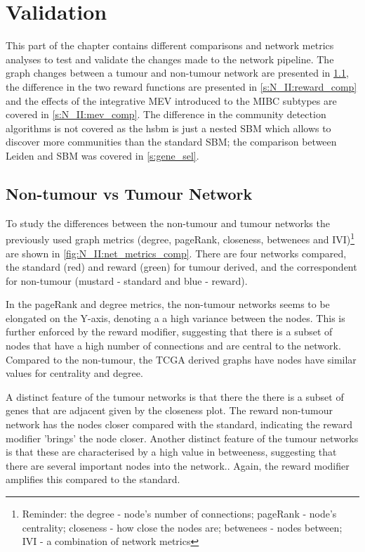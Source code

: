 \section{Validation} \label{s:N_II:validation}


This part of the chapter contains different comparisons and network metrics analyses to test and validate the changes made to the network pipeline. The graph changes between a tumour and non-tumour network are presented in \cref{s:N_II:net_comp}, the difference in the two reward functions are presented in \cref{s:N_II:reward_comp} and the effects of the integrative MEV introduced to the MIBC subtypes are covered in \cref{s:N_II:mev_comp}. The difference in the community detection algorithms is not covered as the \acrfull{hsbm} is just a nested SBM which allows to discover more communities than the standard SBM; the comparison between Leiden and SBM was covered in \cref{s:gene_sel}.


\subsection{Non-tumour vs Tumour Network} \label{s:N_II:net_comp}

To study the differences between the non-tumour and tumour networks the previously used graph metrics (degree, pageRank, closeness, betwenees and IVI)\footnote{Reminder: the degree - node's number of connections; pageRank - node's centrality; closeness - how close the nodes are; betwenees - nodes between; IVI - a combination of network metrics} are shown in \cref{fig:N_II:net_metrics_comp}. There are four networks compared, the standard (red) and reward (green) for tumour derived, and the correspondent for non-tumour (mustard - standard and blue - reward).

In the pageRank and degree metrics, the non-tumour networks seems to be elongated on the Y-axis, denoting a a high variance between the nodes. This is further enforced by the reward modifier, suggesting that there is a subset of nodes that have a high number of connections and are central to the network. Compared to the non-tumour, the TCGA derived graphs have nodes have similar values for centrality and degree. 

A distinct feature of the tumour networks is that there the there is a subset of genes that are adjacent given by the closeness plot. The reward non-tumour network has the nodes closer compared with the standard, indicating the reward modifier 'brings' the node closer. Another distinct feature of the tumour networks is that these are characterised by a high value in betweeness, suggesting that there are several important nodes into the network.. Again, the reward modifier amplifies this compared to the standard.

